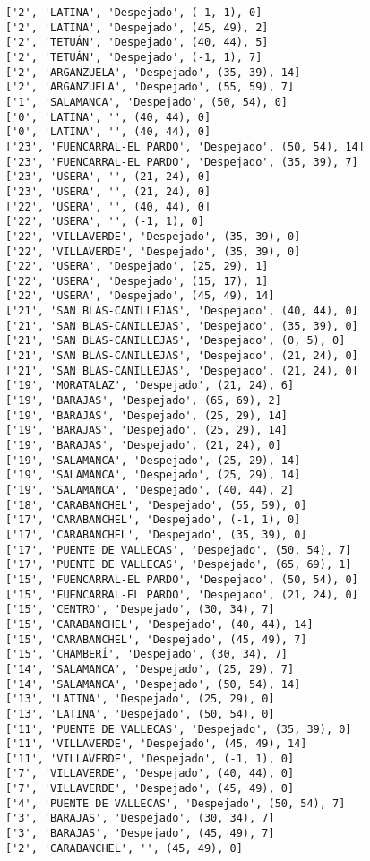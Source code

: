 \documentclass[11pt]{article}
\begin{document}
\begin{Verbatim}[commandchars=\\\{\}]
['2', 'LATINA', 'Despejado', (-1, 1), 0]
['2', 'LATINA', 'Despejado', (45, 49), 2]
['2', 'TETUÁN', 'Despejado', (40, 44), 5]
['2', 'TETUÁN', 'Despejado', (-1, 1), 7]
['2', 'ARGANZUELA', 'Despejado', (35, 39), 14]
['2', 'ARGANZUELA', 'Despejado', (55, 59), 7]
['1', 'SALAMANCA', 'Despejado', (50, 54), 0]
['0', 'LATINA', '', (40, 44), 0]
['0', 'LATINA', '', (40, 44), 0]
['23', 'FUENCARRAL-EL PARDO', 'Despejado', (50, 54), 14]
['23', 'FUENCARRAL-EL PARDO', 'Despejado', (35, 39), 7]
['23', 'USERA', '', (21, 24), 0]
['23', 'USERA', '', (21, 24), 0]
['22', 'USERA', '', (40, 44), 0]
['22', 'USERA', '', (-1, 1), 0]
['22', 'VILLAVERDE', 'Despejado', (35, 39), 0]
['22', 'VILLAVERDE', 'Despejado', (35, 39), 0]
['22', 'USERA', 'Despejado', (25, 29), 1]
['22', 'USERA', 'Despejado', (15, 17), 1]
['22', 'USERA', 'Despejado', (45, 49), 14]
['21', 'SAN BLAS-CANILLEJAS', 'Despejado', (40, 44), 0]
['21', 'SAN BLAS-CANILLEJAS', 'Despejado', (35, 39), 0]
['21', 'SAN BLAS-CANILLEJAS', 'Despejado', (0, 5), 0]
['21', 'SAN BLAS-CANILLEJAS', 'Despejado', (21, 24), 0]
['21', 'SAN BLAS-CANILLEJAS', 'Despejado', (21, 24), 0]
['19', 'MORATALAZ', 'Despejado', (21, 24), 6]
['19', 'BARAJAS', 'Despejado', (65, 69), 2]
['19', 'BARAJAS', 'Despejado', (25, 29), 14]
['19', 'BARAJAS', 'Despejado', (25, 29), 14]
['19', 'BARAJAS', 'Despejado', (21, 24), 0]
['19', 'SALAMANCA', 'Despejado', (25, 29), 14]
['19', 'SALAMANCA', 'Despejado', (25, 29), 14]
['19', 'SALAMANCA', 'Despejado', (40, 44), 2]
['18', 'CARABANCHEL', 'Despejado', (55, 59), 0]
['17', 'CARABANCHEL', 'Despejado', (-1, 1), 0]
['17', 'CARABANCHEL', 'Despejado', (35, 39), 0]
['17', 'PUENTE DE VALLECAS', 'Despejado', (50, 54), 7]
['17', 'PUENTE DE VALLECAS', 'Despejado', (65, 69), 1]
['15', 'FUENCARRAL-EL PARDO', 'Despejado', (50, 54), 0]
['15', 'FUENCARRAL-EL PARDO', 'Despejado', (21, 24), 0]
['15', 'CENTRO', 'Despejado', (30, 34), 7]
['15', 'CARABANCHEL', 'Despejado', (40, 44), 14]
['15', 'CARABANCHEL', 'Despejado', (45, 49), 7]
['15', 'CHAMBERÍ', 'Despejado', (30, 34), 7]
['14', 'SALAMANCA', 'Despejado', (25, 29), 7]
['14', 'SALAMANCA', 'Despejado', (50, 54), 14]
['13', 'LATINA', 'Despejado', (25, 29), 0]
['13', 'LATINA', 'Despejado', (50, 54), 0]
['11', 'PUENTE DE VALLECAS', 'Despejado', (35, 39), 0]
['11', 'VILLAVERDE', 'Despejado', (45, 49), 14]
['11', 'VILLAVERDE', 'Despejado', (-1, 1), 0]
['7', 'VILLAVERDE', 'Despejado', (40, 44), 0]
['7', 'VILLAVERDE', 'Despejado', (45, 49), 0]
['4', 'PUENTE DE VALLECAS', 'Despejado', (50, 54), 7]
['3', 'BARAJAS', 'Despejado', (30, 34), 7]
['3', 'BARAJAS', 'Despejado', (45, 49), 7]
['2', 'CARABANCHEL', '', (45, 49), 0]

\end{Verbatim}
\end{document}
